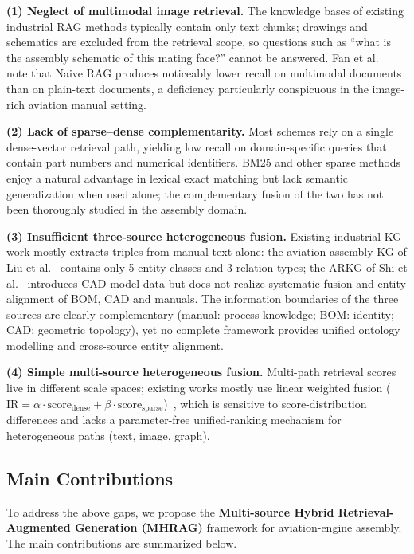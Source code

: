 \documentclass[applsci,article,submit,pdftex,moreauthors]{Definitions/mdpi}
\begin{document}
\textbf{(1) Neglect of multimodal image retrieval.} The knowledge bases of existing industrial RAG methods typically contain only text chunks; drawings and schematics are excluded from the retrieval scope, so questions such as ``what is the assembly schematic of this mating face?'' cannot be answered. Fan et al.~\citep{fan2024ragsurvey} note that Naive RAG produces noticeably lower recall on multimodal documents than on plain-text documents, a deficiency particularly conspicuous in the image-rich aviation manual setting.

\textbf{(2) Lack of sparse--dense complementarity.} Most schemes rely on a single dense-vector retrieval path, yielding low recall on domain-specific queries that contain part numbers and numerical identifiers. BM25 and other sparse methods enjoy a natural advantage in lexical exact matching but lack semantic generalization when used alone; the complementary fusion of the two has not been thoroughly studied in the assembly domain.

\textbf{(3) Insufficient three-source heterogeneous fusion.} Existing industrial KG work mostly extracts triples from manual text alone: the aviation-assembly KG of Liu et al.~\citep{liu2023avkg} contains only 5 entity classes and 3 relation types; the ARKG of Shi et al.~\citep{shi2022arkg} introduces CAD model data but does not realize systematic fusion and entity alignment of BOM, CAD and manuals. The information boundaries of the three sources are clearly complementary (manual: process knowledge; BOM: identity; CAD: geometric topology), yet no complete framework provides unified ontology modelling and cross-source entity alignment.

\textbf{(4) Simple multi-source heterogeneous fusion.} Multi-path retrieval scores live in different scale spaces; existing works mostly use linear weighted fusion ($\text{IR} = \alpha\cdot \text{score}_{\text{dense}} + \beta\cdot \text{score}_{\text{sparse}}$)~\citep{shen2025hybridrag}, which is sensitive to score-distribution differences and lacks a parameter-free unified-ranking mechanism for heterogeneous paths (text, image, graph).

\subsection{Main Contributions}
\label{sec:contribution}

To address the above gaps, we propose the \textbf{Multi-source Hybrid Retrieval-Augmented Generation (MHRAG)} framework for aviation-engine assembly. The main contributions are summarized below.
\end{document}
